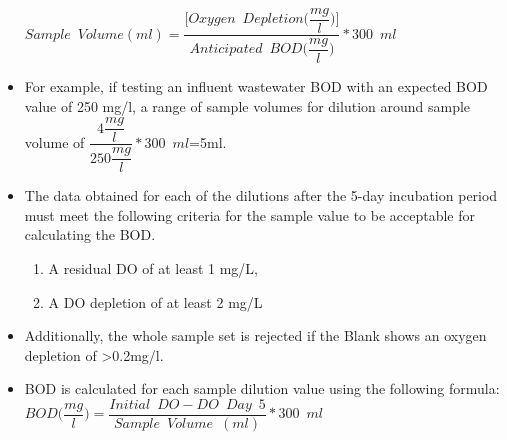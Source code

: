 \begin{itemize}
\textbf{$Sample \enspace Volume (ml) = \dfrac{\Big[Oxygen \enspace Depletion \Big(\dfrac{mg}{l}\Big)\Big]}{Anticipated \enspace BOD \Big(\dfrac{mg}{l}\Big)}*300 \enspace ml$}\\

\vspace{0.4cm}
\item For example, if testing an influent wastewater BOD with an expected BOD value of 250 mg/l, a range of sample volumes for dilution around sample volume of $\dfrac{4\dfrac{mg}{l}}{250 \dfrac{mg}{l}}*300 \enspace ml$=5ml.\\
\vspace{0.4cm}
\item The data obtained for each of the dilutions after the 5-day incubation period must meet the following criteria for the sample value to be acceptable for calculating the BOD.\\
\vspace{0.4cm}

\begin{enumerate}[1.]
\setlength\itemsep{1em}

\item A residual DO of at least 1 mg/L,
\item A DO depletion of at least 2 mg/L
\end{enumerate}
\vspace{0.4cm}
\item Additionally, the whole sample set is rejected if the Blank shows an oxygen depletion of >0.2mg/l.\\
\vspace{0.4cm}
\item BOD is calculated for each sample dilution value using the following formula:\\
\vspace{0.4cm}
\textbf{$BOD \Big(\dfrac{mg}{l}\Big) = \dfrac{Initial \enspace DO - DO \enspace Day \enspace 5}{Sample \enspace Volume \enspace (ml)}*300 \enspace ml$}\\



\end{itemize}
\vspace{0.4cm}
